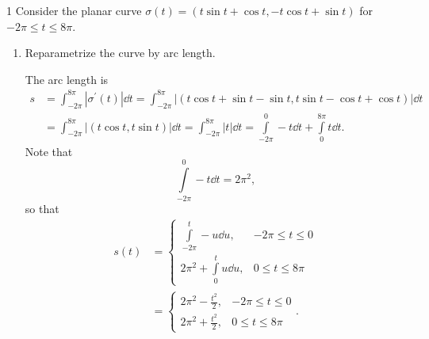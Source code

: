 \documentclass[11pt]{article}
\begin{document}
\begin{problem}{1}
	Consider the planar curve \(\sigma(t) = (t\sin t + \cos t, -t\cos t +\sin t)\) for \( -2\pi \leq t \leq 8\pi \).
	\begin{enumerate}[label=(\alph*)]
		\item Reparametrize the curve by arc length.
		      \begin{answer}
			      The arc length is
			      \begin{equation}
				      \label{eq:3}
				      \begin{aligned}
					      s & = \int_{-2\pi}^{8\pi} | \sigma^{\prime}(t) | \dd{t} = \int_{-2\pi}^{8\pi} \left| (t\cos t + \sin t - \sin t, t\sin t - \cos t + \cos t) \right| \dd{t}             \\
					        & = \int_{-2\pi}^{8\pi} \left| (t\cos t, t\sin t) \right| \dd{t} = \int_{-2\pi}^{8\pi} |t| \dd{t} = \int\limits_{-2\pi}^0 -t \dd{t} + \int\limits_0^{8\pi} t \dd{t}.
				      \end{aligned}
			      \end{equation}
			      Note that
			      \begin{equation}
				      \label{eq:5}
				      \int\limits_{-2\pi}^0 -t \dd{t} = 2\pi^2,
			      \end{equation}
			      so that
			      \begin{equation}
				      \label{eq:4}
				      \begin{aligned}
					      s(t) & = \begin{cases}
						               \int\limits_{-2\pi}^{t} -u \dd{u},   & -2\pi \leq t \leq 0 \\
						               2\pi^2 + \int\limits_0^{t} u \dd{u}, & 0 \leq t \leq 8\pi
					               \end{cases} \\
					           & = \begin{cases}
						               2\pi^2 - \frac{t^2}{2}, & -2\pi \leq t \leq 0 \\
						               2\pi^2 + \frac{t^2}{2}, & 0 \leq t \leq 8\pi
					               \end{cases}.
				      \end{aligned}
			      \end{equation}


\end{answer}
\end{enumerate}
\end{problem}
\end{document}
